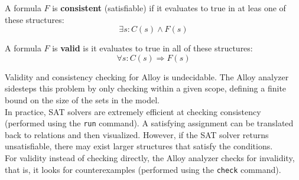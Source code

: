 A formula $F$ is \textbf{consistent} (satisfiable) if it evaluates to true in at leas one of these structures:
$$\exists s : C(s) \wedge F(s)$$

A formula $F$ is \textbf{valid} is it evaluates to true in all of these structures:
$$\forall s : C(s) \Rightarrow F(s)$$

Validity and consistency checking for Alloy is undecidable. The Alloy analyzer sidesteps this problem by only checking within a given scope, defining a finite bound on the size of the sets in the model. \\

In practice, SAT solvers are extremely efficient at checking consistency (performed using the \texttt{run} command). A satisfying assignment can be translated back to relations and then visualized. However, if the SAT solver returns unsatisfiable, there may exist larger structures that satisfy the conditions. \\

For validity instead of checking directly, the Alloy analyzer checks for invalidity, that is, it looks for counterexamples (performed using the \texttt{check} command).